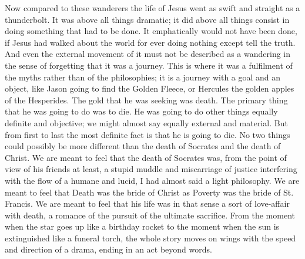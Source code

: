 Now compared to these wanderers the life of Jesus went as swift and straight as a thunderbolt. It was above all things dramatic; it did above all things consist in doing something that had to be done. It emphatically would not have been done, if Jesus had walked about the world for ever doing nothing except tell the truth. And even the external movement of it must not be described as a wandering in the sense of forgetting that it was a journey. This is where it was a fulfilment of the myths rather than of the philosophies; it is a journey with a goal and an object, like Jason going to find the Golden Fleece, or Hercules the golden apples of the Hesperides. The gold that he was seeking was death. The primary thing that he was going to do was to die. He was going to do other things equally definite and objective; we might almost say equally external and material. But from first to last the most definite fact is that he is going to die. No two things could possibly be more different than the death of Socrates and the death of Christ. We are meant to feel that the death of Socrates was, from the point of view of his friends at least, a stupid muddle and miscarriage of justice interfering with the flow of a humane and lucid, I had almost said a light philosophy. We are meant to feel that Death was the bride of Christ as Poverty was the bride of St. Francis. We are meant to feel that his life was in that sense a sort of love-affair with death, a romance of the pursuit of the ultimate sacrifice. From the moment when the star goes up like a birthday rocket to the moment when the sun is extinguished like a funeral torch, the whole story moves on wings with the speed and direction of a drama, ending in an act beyond words.

